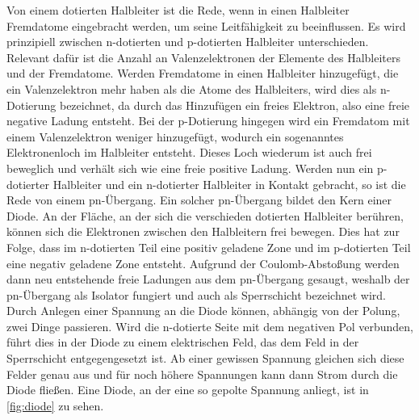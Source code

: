 Von einem dotierten Halbleiter ist die Rede, wenn in einen Halbleiter Fremdatome eingebracht werden, um seine Leitfähigkeit zu beeinflussen. Es wird prinzipiell
zwischen n-dotierten und p-dotierten Halbleiter unterschieden. Relevant dafür ist die Anzahl an Valenzelektronen der Elemente des Halbleiters und der Fremdatome.
Werden Fremdatome in einen Halbleiter hinzugefügt, die ein Valenzelektron mehr haben als die Atome des Halbleiters, wird dies als n-Dotierung bezeichnet,
da durch das Hinzufügen ein freies Elektron, also eine freie negative Ladung entsteht. Bei der p-Dotierung hingegen wird ein Fremdatom mit einem Valenzelektron weniger hinzugefügt,
wodurch ein sogenanntes Elektronenloch im Halbleiter entsteht. Dieses Loch wiederum ist auch frei beweglich und verhält sich wie eine freie positive Ladung.
\newline
Werden nun ein p-dotierter Halbleiter und ein n-dotierter Halbleiter in Kontakt gebracht, so ist die Rede von einem pn-Übergang. Ein solcher pn-Übergang bildet den Kern einer Diode.
An der Fläche, an der sich die verschieden dotierten Halbleiter berühren, können sich die Elektronen zwischen den Halbleitern frei bewegen. Dies hat zur Folge, dass
im n-dotierten Teil eine positiv geladene Zone und im p-dotierten Teil eine negativ geladene Zone entsteht. Aufgrund der Coulomb-Abstoßung werden dann neu entstehende freie Ladungen
aus dem pn-Übergang gesaugt, weshalb der pn-Übergang als Isolator fungiert und auch als Sperrschicht bezeichnet wird.
\newline
Durch Anlegen einer Spannung an die Diode können, abhängig von der Polung, zwei Dinge passieren. Wird die n-dotierte Seite mit dem negativen Pol verbunden, führt dies in der Diode
zu einem elektrischen Feld, das dem Feld in der Sperrschicht entgegengesetzt ist. Ab einer gewissen Spannung gleichen sich diese Felder genau aus und für noch höhere Spannungen kann
dann Strom durch die Diode fließen. Eine Diode, an der eine so gepolte Spannung anliegt, ist in \autoref{fig:diode} zu sehen.

